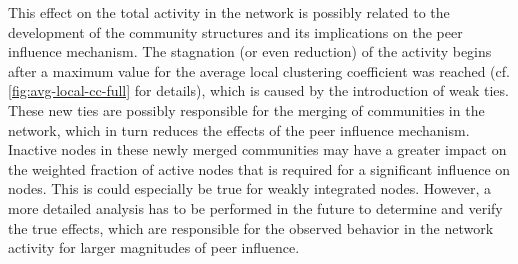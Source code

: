 This effect on the total activity in the network is possibly related to the development of the community structures and its implications on the peer influence mechanism.
The stagnation (or even reduction) of the activity begins after a maximum value for the average local clustering coefficient was reached (cf. \cref{fig:avg-local-cc-full} for details), which is caused by the introduction of weak ties.
These new ties are possibly responsible for the merging of communities in the network, which in turn reduces the effects of the peer influence mechanism.
Inactive nodes in these newly merged communities may have a greater impact on the weighted fraction of active nodes that is required for a significant influence on nodes.
This is could especially be true for weakly integrated nodes.
However, a more detailed analysis has to be performed in the future to determine and verify the true effects, which are responsible for the observed behavior in the network activity for larger magnitudes of peer influence.


